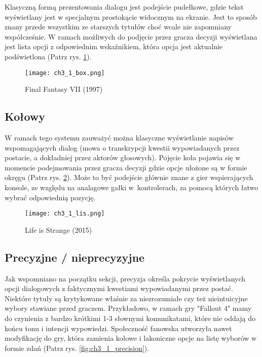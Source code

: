 Klasyczną formą prezentowania dialogu jest podejście pudełkowe, gdzie tekst wyświetlany jest w
specjalnym prostokącie widocznym na ekranie. Jest to sposób znany przede wszystkim ze starszych
tytułów choć wcale nie zapomniany współcześnie. W ramach możliwych do podjęcie przez gracza
decyzji wyświetlana jest lista opcji z odpowiednim wskaźnikiem, która opcja jest aktualnie
podświetlona (Patrz rys. \ref{fig:ch3_1_box}).

\begin{figure}[h]
    \texttt{[image: ch3\_1\_box.png]}
    \caption{Final Fantasy VII (1997)}
    \centering
    \label{fig:ch3_1_box}
\end{figure}

\newpage

\subsection{Kołowy}

W ramach tego systemu zauważyć można klasyczne wyświetlanie napisów wspomagających dialog (mowa o
transkrypcji kwestii wypowiadanych przez postacie, a dokładniej przez aktorów głosowych). Pojęcie
koła pojawia się w momencie podejmowania przez gracza decyzji gdzie opcje ułożone są
w formie okręgu (Patrz rys. \ref{fig:ch3_1_wheel}). Może to być podejście głównie znane
z gier wspierających konsole, ze względu na analagowe gałki w~kontrolerach, za pomocą których
łatwo wybrać odpowiednią pozycję.

\begin{figure}[h]
    \centering
    \texttt{[image: ch3\_1\_lis.png]}
    \caption{Life is Strange (2015)}
    \label{fig:ch3_1_wheel}
\end{figure}

\newpage

\subsection{Precyzjne / nieprecyzyjne}\label{subsubsection:ch3_1_precision}

Jak wspomniano na początku sekcji, precyzja określa pokrycie wyświetlanych opcji dialogowych z
faktycznymi kwestiami wypowiadanymi przez postać. Niektóre tytuły są krytykowane właśnie za
niezrozumiałe czy też nieintuicyjne wybory stawiane przed graczem. Przykładowo, w ramach gry
"Fallout 4" mamy do czynienia z bardzo krótkimi 1-3 słownymi komunikatami, które nie oddają
do końcu tonu i intencji wypowiedzi. Społeczność fanowska utworzyła nawet modyfikację do gry,
która zamienia kołowe i lakoniczne opcje na listę wyborów w formie zdań
(Patrz rys. \ref{fig:ch3_1_precision}).

